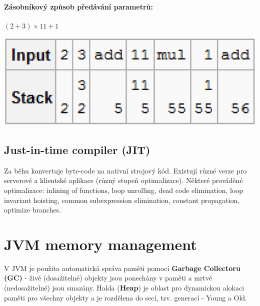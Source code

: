 \documentclass{scrreprt}
\begin{document}
\paragraph*{Zásobníkový způsob předávání parametrů:} $(2 + 3) \times 11 + 1$
\begin{center}
\includegraphics[scale=0.5]{img/jvm_stack}
\end{center}

\subsection{Just-in-time compiler (JIT)}
Za běhu konvertuje byte-code na nativní strojový kód. Existují různé verze pro serverové a klientské aplikace (různý stupeň optimalizace). Některé prováděné optimalizace: inlining of functions, loop unrolling, dead code elimination, loop invariant hoisting, common subexpression elimination, constant propagation, optimize branches.

\section{JVM memory management}
V JVM je použita automatická správa paměti pomocí \textbf{Garbage Collectoru (GC)} - živé (dosažitelné) objekty jsou ponechány v paměti a mrtvé (nedosažitelné) jsou smazány. Halda (\textbf{Heap}) je oblast pro dynamickou alokaci paměti pro všechny objekty a je rozdělena do secí, tzv. generací - Young a Old.
\end{document}
